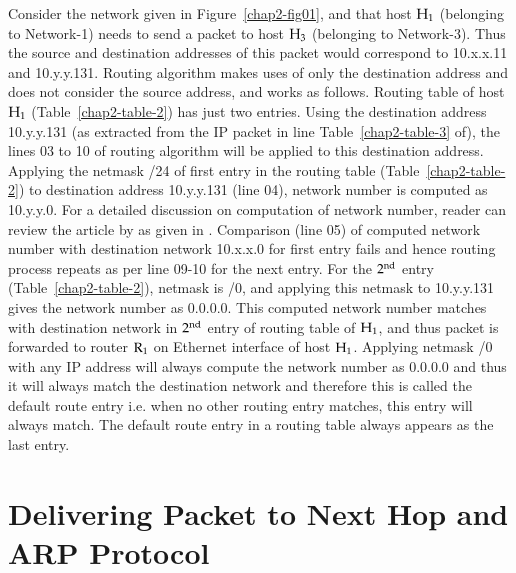 \begin{multicols}{2}
Consider the network given in Figure~\ref{chap2-fig01}, and that host ${\rm H}_{1}$ (belonging to Network-1) needs to send a packet to host ${\rm H}_{3}$ (belonging to Network-3). Thus the source and destination addresses of this packet would correspond to 10.x.x.11 and 10.y.y.131. Routing algorithm makes uses of only the destination address and does not consider the source address, and works as follows. Routing table of host ${\rm H}_{1}$ (Table~\ref{chap2-table-2}) has just two entries. Using the destination address 10.y.y.131 (as extracted from the IP packet in line Table~\ref{chap2-table-3} of), the lines 03 to 10 of routing algorithm will be applied to this destination address. Applying the netmask /24 of first entry in the routing table (Table~\ref{chap2-table-2}) to destination address 10.y.y.131 (line 04), network number is computed as 10.y.y.0. For a detailed discussion on computation of network number, reader can review the article by as given in \cite{art2-key01}. Comparison (line 05) of computed network number with destination network 10.x.x.0 for first entry fails and hence routing process repeats as per line 09-10 for the next entry. For the $2^{\rm nd}$ entry (Table~\ref{chap2-table-2}), netmask is /0, and applying this netmask to 10.y.y.131 gives the network number as 0.0.0.0. This computed network number matches with destination network in $2^{\rm nd}$ entry of routing table of ${\rm H}_{1}$, and thus packet is forwarded to router ${\rm R}_{1}$ on Ethernet interface of host ${\rm H}_{1}$. Applying netmask /0 with any IP address will always compute the network number as 0.0.0.0 and thus it will always match the destination network and therefore this is called the default route entry i.e. when no other routing entry matches, this entry will always match. The default route entry in a routing table always appears as the last entry.

\section{Delivering Packet to Next Hop and ARP Protocol}\label{chap2-sec3}


\end{multicols}
